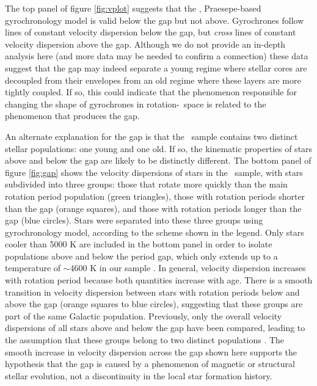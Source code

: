 The top panel of figure \ref{fig:vplot} suggests that the \citet{angus2019},
Praesepe-based gyrochronology model is valid below the gap but not above.
Gyrochrones follow lines of constant velocity dispersion below the gap, but
{\it cross} lines of constant velocity dispersion above the gap.
Although we do not provide an in-depth analysis here (and more data may be
needed to confirm a connection) these data suggest that the gap may indeed
separate a young regime where stellar cores are decoupled from their envelopes
from an old regime where these layers are more tightly coupled.
If so, this could indicate that the phenomenon responsible for changing the
shape of gyrochrones in rotation-\teff\ space is related to the phenomenon that
produces the gap.

An alternate explanation for the gap is that the \mct\ sample contains two
distinct stellar populations: one young and one old.
If so, the kinematic properties of stars above and below the gap are likely to
be distinctly different.
The bottom panel of figure \ref{fig:gap} shows the velocity dispersions of
stars in the \mct\ sample, with stars subdivided into three groups: those that
rotate more quickly than the main rotation period population (green
triangles), those with rotation periods shorter than the gap (orange squares),
and those with rotation periods longer than the gap (blue circles).
Stars were separated into these three groups using \citet{angus2019}
gyrochronology model, according to the scheme shown in the legend.
Only stars cooler than 5000 K are included in the bottom panel in order to
isolate populations above and below the period gap, which only extends up to a
temperature of $\sim$4600 K in our sample \citep[Although][found that the gap
extends to temperatures as hot as 6000 K]{davenport2017}.
In general, velocity dispersion increases with rotation period because both
quantities increase with age.
There is a smooth transition in velocity dispersion between stars with
rotation periods below and above the gap (orange squares to blue circles),
suggesting that these groups are part of the same Galactic population.
Previously, only the overall velocity dispersions of all stars above and below
the gap have been compared, leading to the assumption that these groups belong
to two distinct populations \citep{mcquillan2014}.
The smooth increase in velocity dispersion across the gap shown here supports
the hypothesis that the gap is caused by a phenomenon of magnetic or
structural stellar evolution, not a discontinuity in the local star formation
history.

